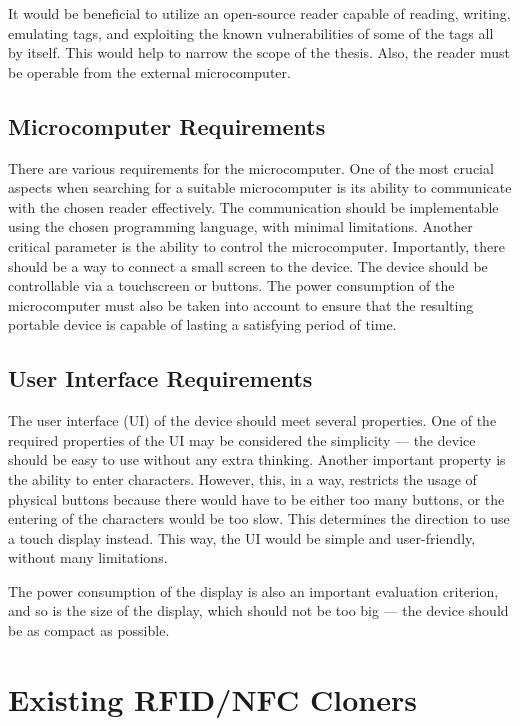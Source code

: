 It would be beneficial to utilize an open-source reader capable of reading, writing, emulating tags, and exploiting the known vulnerabilities of some of the tags all by itself. This would help to narrow the scope of the thesis. Also, the reader must be operable from the external microcomputer.

\subsection{Microcomputer Requirements}

There are various requirements for the microcomputer. One of the most crucial aspects when searching for a suitable microcomputer is its ability to communicate with the chosen reader effectively. The communication should be implementable using the chosen programming language, with minimal limitations. Another critical parameter is the ability to control the microcomputer. Importantly, there should be a way to connect a small screen to the device. The device should be controllable via a touchscreen or buttons. The power consumption of the microcomputer must also be taken into account to ensure that the resulting portable device is capable of lasting a satisfying period of time.


\subsection{User Interface Requirements}

The user interface (UI) of the device should meet several properties. One of the required properties of the UI may be considered the simplicity --- the device should be easy to use without any extra thinking. Another important property is the ability to enter characters. However, this, in a way, restricts the usage of physical buttons because there would have to be either too many buttons, or the entering of the characters would be too slow. This determines the direction to use a touch display instead. This way, the UI would be simple and user-friendly, without many limitations. 

The power consumption of the display is also an important evaluation criterion, and so is the size of the display, which should not be too big --- the device should be as compact as possible.


\section{Existing RFID/NFC Cloners}

